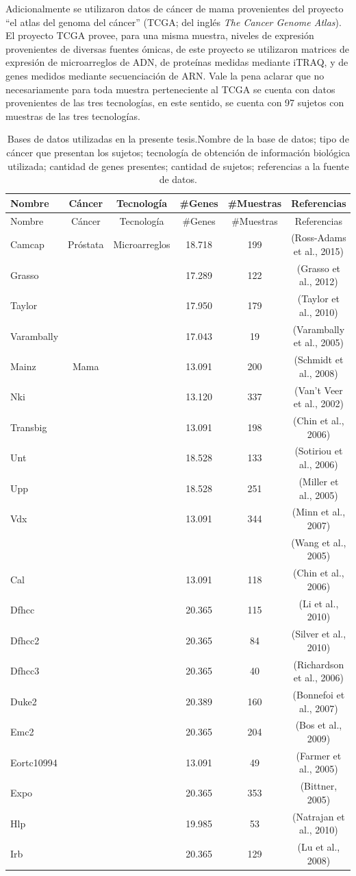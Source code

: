 \documentclass[12pt,twoside]{reedthesis}
\begin{document}
Adicionalmente se utilizaron datos de cáncer de mama provenientes del proyecto ``el atlas del genoma del cáncer'' (TCGA; del inglés \emph{The Cancer Genome Atlas}). El proyecto TCGA provee, para una misma muestra, niveles de expresión provenientes de diversas fuentes ómicas, de este proyecto se utilizaron matrices de expresión de microarreglos de ADN, de proteínas medidas mediante iTRAQ, y de genes medidos mediante secuenciación de ARN. Vale la pena aclarar que no necesariamente para toda muestra perteneciente al TCGA se cuenta con datos provenientes de las tres tecnologías, en este sentido, se cuenta con 97 sujetos con muestras de las tres tecnologías.
\begin{longtable}[]{@{}lccccc@{}}
\caption{Bases de datos utilizadas en la presente tesis.\label{tab:databases}
Nombre de la base de datos; tipo de cáncer que presentan los sujetos; tecnología de obtención de información biológica utilizada; cantidad de genes presentes; cantidad de sujetos; referencias a la fuente de datos.}\tabularnewline
\toprule
Nombre & Cáncer & Tecnología & \#Genes & \#Muestras & Referencias\tabularnewline
\midrule
\endfirsthead
\toprule
Nombre & Cáncer & Tecnología & \#Genes & \#Muestras & Referencias\tabularnewline
\midrule
\endhead
Camcap & Próstata & Microarreglos & 18.718 & 199 & (Ross-Adams et al., 2015)\tabularnewline
Grasso & & & 17.289 & 122 & (Grasso et al., 2012)\tabularnewline
Taylor & & & 17.950 & 179 & (Taylor et al., 2010)\tabularnewline
Varambally & & & 17.043 & 19 & (Varambally et al., 2005)\tabularnewline
Mainz & Mama & & 13.091 & 200 & (Schmidt et al., 2008)\tabularnewline
Nki & & & 13.120 & 337 & (Van't Veer et al., 2002)\tabularnewline
Transbig & & & 13.091 & 198 & (Chin et al., 2006)\tabularnewline
Unt & & & 18.528 & 133 & (Sotiriou et al., 2006)\tabularnewline
Upp & & & 18.528 & 251 & (Miller et al., 2005)\tabularnewline
Vdx & & & 13.091 & 344 & (Minn et al., 2007)\tabularnewline
& & & & & (Wang et al., 2005)\tabularnewline
Cal & & & 13.091 & 118 & (Chin et al., 2006)\tabularnewline
Dfhcc & & & 20.365 & 115 & (Li et al., 2010)\tabularnewline
Dfhcc2 & & & 20.365 & 84 & (Silver et al., 2010)\tabularnewline
Dfhcc3 & & & 20.365 & 40 & (Richardson et al., 2006)\tabularnewline
Duke2 & & & 20.389 & 160 & (Bonnefoi et al., 2007)\tabularnewline
Emc2 & & & 20.365 & 204 & (Bos et al., 2009)\tabularnewline
Eortc10994 & & & 13.091 & 49 & (Farmer et al., 2005)\tabularnewline
Expo & & & 20.365 & 353 & (Bittner, 2005)\tabularnewline
Hlp & & & 19.985 & 53 & (Natrajan et al., 2010)\tabularnewline
Irb & & & 20.365 & 129 & (Lu et al., 2008)\tabularnewline

\end{longtable}
\end{document}
